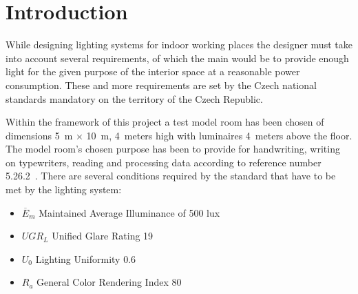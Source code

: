 \section{Introduction} \label{sec:intro}
While designing lighting systems for indoor working places the designer must take into account several requirements, of which the main would be to provide enough light for the given purpose of the interior space at a reasonable power consumption. These and more requirements are set by the Czech national standards \cite{12464} mandatory on the territory of the Czech Republic.

Within the framework of this project a test model room has been chosen of dimensions 5~m $\times$ 10~m, 4~meters high with luminaires 4~meters above the floor. The model room's chosen purpose has been to provide for handwriting, writing on typewriters, reading and processing data according to reference number 5.26.2~\cite{12464}. There are several conditions required by the standard that have to be met by the lighting system:


\begin{itemize}
	\item $\overline{E}_{m}$ Maintained Average Illuminance of 500 lux
	\item $UGR_{L}$ Unified Glare Rating 19
	\item $U_{0}$ Lighting Uniformity 0.6
	\item $R_{a}$ General Color Rendering Index 80
\end{itemize}

